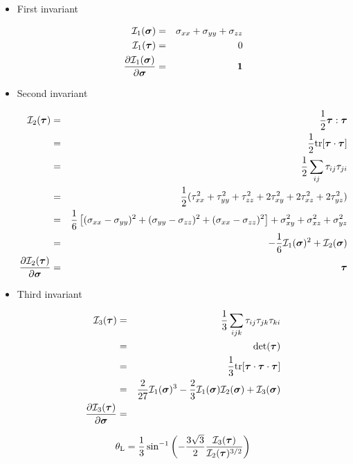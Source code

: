 \begin{itemize}
\item First invariant %

\begin{eqnarray}
{\cal I}_1(\bm\sigma) &=& \sigma_{xx}+\sigma_{yy}+\sigma_{zz} \nonumber\\
{\cal I}_1(\bm\tau) &=& 0 \nonumber\\ 
\frac{\partial {\cal I}_1(\bm\sigma)}{\partial \bm\sigma} &=& {\bm 1}  \nonumber
\end{eqnarray}


\item Second invariant %


\begin{eqnarray}
{\cal I}_2(\bm\tau) 
&=& \frac12 {\bm \tau}:{\bm \tau} \nonumber\\
&=& \frac12 {\rm tr} [{\bm \tau}\cdot {\bm \tau}] \nonumber\\
&=& \frac12 \sum_{ij} \tau_{ij}\tau_{ji}  \nonumber\\
&=& \frac12 ( \tau_{xx}^2 + \tau_{yy}^2 +\tau_{zz}^2 + 2\tau_{xy}^2+ 2\tau_{xz}^2+ 2\tau_{yz}^2) \nonumber\\
&=& \frac{1}{6}\left[(\sigma_{xx}-\sigma_{yy})^2 + (\sigma_{yy}-\sigma_{zz})^2 
+ (\sigma_{xx}-\sigma_{zz})^2 \right]  + \sigma_{xy}^2 + \sigma_{xz}^2 + \sigma_{yz}^2 \nonumber\\
&=&  -\frac16 {\cal I}_1(\bm\sigma)^2 + {\cal I}_2(\bm\sigma) \nonumber\\
\frac{\partial {\cal I}_2(\bm\tau)}{\partial \bm\sigma} &=& \bm\tau   \nonumber
\end{eqnarray}

\item Third invariant %

\begin{eqnarray}
{\cal I}_3(\bm\tau) 
&=& \frac13 \sum_{ijk} \tau_{ij}\tau_{jk}\tau_{ki} \nonumber\\
&=& {\rm det}(\bm\tau) \nonumber\\
&=& \frac13 {\rm tr} [{\bm \tau}\cdot {\bm \tau} \cdot {\bm \tau}] \nonumber\\
&=& \frac{2}{27}  {\cal I}_1(\bm\sigma)^3 - \frac23{\cal I}_1(\bm\sigma) {\cal I}_2(\bm\sigma)
+{\cal I}_3(\bm\sigma) \nonumber\\
\frac{\partial {\cal I}_3(\bm\tau)}{\partial \bm\sigma} &=&
\end{eqnarray}

\begin{equation}
\theta_{\rm L}=\frac{1}{3} \sin^{-1} 
\left( -\frac{3\sqrt{3}}{2} \frac{{\cal I}_3({\bm \tau})}{{\cal I}_2({\bm \tau})^{3/2}} \right)
\end{equation}


\end{itemize}


